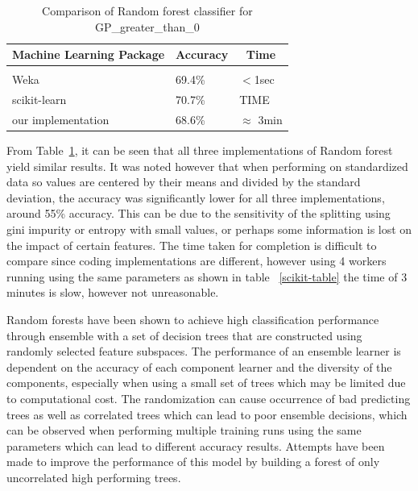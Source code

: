 \documentclass{article} %
\begin{document}
\begin{table}[t]
\caption{Comparison of Random forest classifier for GP\_greater\_than\_0}
\label{clas-table}
\begin{center}
\begin{tabular}{lll}
\multicolumn{1}{c}{\bf Machine Learning Package} &\multicolumn{1}{c}{\bf Accuracy} &\multicolumn{1}{c}{\bf Time}
\\ \hline \\
Weka         &69.4\%	&$<$1sec \\
scikit-learn             &70.7\%	&TIME \\
our implementation             &68.6\%	&$\approx$ 3min \\

\end{tabular}
\end{center}
\end{table}

From Table~\ref{clas-table}, it can be seen that all three implementations of Random forest yield similar results. It was noted however that when performing on standardized data so values are centered by their means and divided by the standard deviation, the accuracy was significantly lower for all three implementations, around 55\% accuracy. This can be due to the sensitivity of the splitting using gini impurity or entropy with small values, or perhaps some information is lost on the impact of certain features. The time taken for completion is difficult to compare since coding implementations are different, however using 4 workers running using the same parameters as shown in table ~\ref{scikit-table} the time of 3 minutes is slow, however not unreasonable. 

Random forests have been shown to achieve high classification performance through ensemble with a set of decision trees that are constructed using randomly selected feature subspaces. The performance of an ensemble learner is dependent on the accuracy of each component learner and the diversity of the components, especially when using a small set of trees which may be limited due to computational cost. The randomization can cause occurrence of bad predicting trees as well as correlated trees which can lead to poor ensemble decisions, which can be observed when performing multiple training runs using the same parameters which can lead to different accuracy results. Attempts have been made to improve the performance of this model by building a forest of only uncorrelated high performing trees. \cite{Bharathidason2014}
\end{document}
